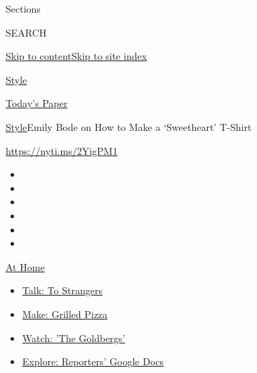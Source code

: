 Sections

SEARCH

\protect\hyperlink{site-content}{Skip to
content}\protect\hyperlink{site-index}{Skip to site index}

\href{https://www.nytimes3xbfgragh.onion/section/style}{Style}

\href{https://myaccount.nytimes3xbfgragh.onion/auth/login?response_type=cookie\&client_id=vi}{}

\href{https://www.nytimes3xbfgragh.onion/section/todayspaper}{Today's
Paper}

\href{/section/style}{Style}\textbar{}Emily Bode on How to Make a
`Sweetheart' T-Shirt

\href{https://nyti.ms/2YigPM1}{https://nyti.ms/2YigPM1}

\begin{itemize}
\item
\item
\item
\item
\item
\item
\end{itemize}

\href{https://www.nytimes3xbfgragh.onion/spotlight/at-home?action=click\&pgtype=Article\&state=default\&region=TOP_BANNER\&context=at_home_menu}{At
Home}

\begin{itemize}
\tightlist
\item
  \href{https://www.nytimes3xbfgragh.onion/2020/08/03/well/family/the-benefits-of-talking-to-strangers.html?action=click\&pgtype=Article\&state=default\&region=TOP_BANNER\&context=at_home_menu}{Talk:
  To Strangers}
\item
  \href{https://www.nytimes3xbfgragh.onion/2020/08/01/at-home/coronavirus-make-pizza-on-a-grill.html?action=click\&pgtype=Article\&state=default\&region=TOP_BANNER\&context=at_home_menu}{Make:
  Grilled Pizza}
\item
  \href{https://www.nytimes3xbfgragh.onion/2020/07/31/arts/television/goldbergs-abc-stream.html?action=click\&pgtype=Article\&state=default\&region=TOP_BANNER\&context=at_home_menu}{Watch:
  'The Goldbergs'}
\item
  \href{https://www.nytimes3xbfgragh.onion/interactive/2020/at-home/even-more-reporters-editors-diaries-lists-recommendations.html?action=click\&pgtype=Article\&state=default\&region=TOP_BANNER\&context=at_home_menu}{Explore:
  Reporters' Google Docs}
\end{itemize}

